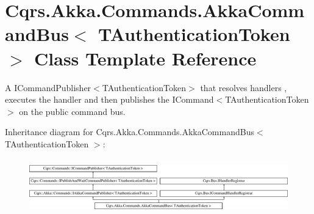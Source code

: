 \hypertarget{classCqrs_1_1Akka_1_1Commands_1_1AkkaCommandBus}{}\section{Cqrs.\+Akka.\+Commands.\+Akka\+Command\+Bus$<$ T\+Authentication\+Token $>$ Class Template Reference}
\label{classCqrs_1_1Akka_1_1Commands_1_1AkkaCommandBus}


A I\+Command\+Publisher$<$\+T\+Authentication\+Token$>$ that resolves handlers , executes the handler and then publishes the I\+Command$<$\+T\+Authentication\+Token$>$ on the public command bus.  


Inheritance diagram for Cqrs.\+Akka.\+Commands.\+Akka\+Command\+Bus$<$ T\+Authentication\+Token $>$\+:\begin{figure}[H]
\begin{center}
\leavevmode
\includegraphics[height=2.419007cm]{classCqrs_1_1Akka_1_1Commands_1_1AkkaCommandBus}
\end{center}
\end{figure}
